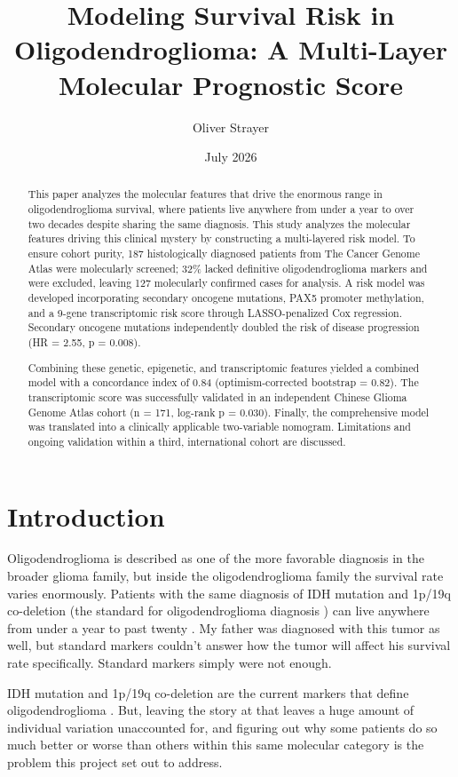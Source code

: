 \documentclass[11pt, letterpaper]{article}
\title{Modeling Survival Risk in Oligodendroglioma: A Multi-Layer Molecular Prognostic Score}
\author{
    Oliver Strayer\\   
}
\date{July 2026}
\begin{document}
\maketitle

\begin{abstract}
This paper analyzes the molecular features that drive the enormous range in oligodendroglioma survival, where patients live anywhere from under a year to over two decades despite sharing the same diagnosis. This study analyzes the molecular features driving this clinical mystery by constructing a multi-layered risk model. To ensure cohort purity, 187 histologically diagnosed patients from The Cancer Genome Atlas were molecularly screened; 32\% lacked definitive oligodendroglioma markers and were excluded, leaving 127 molecularly confirmed cases for analysis. A risk model was developed incorporating secondary oncogene mutations, PAX5 promoter methylation, and a 9-gene transcriptomic risk score through LASSO-penalized Cox regression. Secondary oncogene mutations independently doubled the risk of disease progression (HR = 2.55, p = 0.008). 

Combining these genetic, epigenetic, and transcriptomic features yielded a combined model with a concordance index of 0.84 (optimism-corrected bootstrap = 0.82). The transcriptomic score was successfully validated in an independent Chinese Glioma Genome Atlas cohort (n = 171, log-rank p = 0.030). Finally, the comprehensive model was translated into a clinically applicable two-variable nomogram. Limitations and ongoing validation within a third, international cohort are discussed.
\end{abstract}

\section{Introduction}
Oligodendroglioma is described as one of the more favorable diagnosis in the broader glioma family, but inside the oligodendroglioma family the survival rate varies enormously. Patients with the same diagnosis of IDH mutation and 1p/19q co-deletion (the standard for oligodendroglioma diagnosis \cite{WHO2021}) can live anywhere from under a year to past twenty \cite{CancerGenomeAtlas2015}. My father was diagnosed with this tumor as well, but standard markers couldn't answer how the tumor will affect his survival rate specifically. Standard markers simply were not enough. 

IDH mutation and 1p/19q co-deletion are the current markers that define oligodendroglioma \cite{WHO2021}. But, leaving the story at that leaves a huge amount of individual variation unaccounted for, and figuring out why some patients do so much better or worse than others within this same molecular category is the problem this project set out to address.
\end{document}
